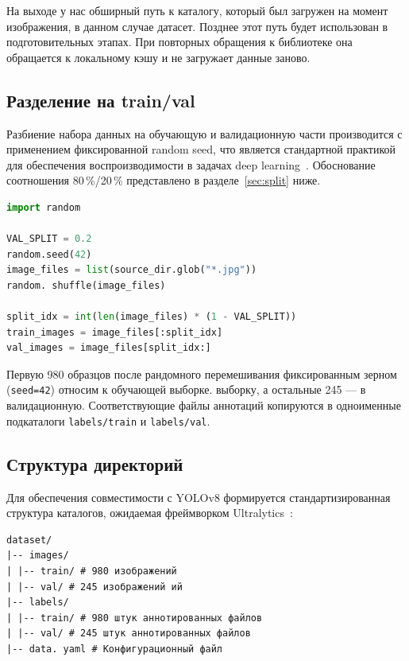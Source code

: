 На выходе у нас обширный путь к каталогу, который был загружен на момент изображения, в данном случае датасет. Позднее этот путь будет использован в подготовительных этапах. При повторных обращения к библиотеке она обращается к локальному кэшу и не загружает данные заново.

\subsection{Разделение на train/val}

Разбиение набора данных на обучающую и валидационную части производится с применением фиксированной random seed, что является стандартной практикой для обеспечения воспроизводимости в задачах deep learning~\cite{he2016resnet}. Обоснование соотношения 80\,\%/20\,\% представлено в разделе~\ref{sec:split} ниже.

\begin{lstlisting}[language=Python, caption=Разделение данных на обучающую и валидационную выборки, label=lst:split]
import random

VAL_SPLIT = 0.2
random.seed(42)
image_files = list(source_dir.glob("*.jpg"))
random. shuffle(image_files)

split_idx = int(len(image_files) * (1 - VAL_SPLIT))
train_images = image_files[:split_idx]
val_images = image_files[split_idx:]
\end{lstlisting}

Первую 980 образцов после рандомного перемешивания фиксированным зерном (\texttt{seed=42}) относим к обучающей выборке. выборку, а остальные 245 --- в валидационную. Соответствующие файлы аннотаций копируются в одноименные подкаталоги \texttt{labels/train} и \texttt{labels/val}.

\subsection{Структура директорий}

Для обеспечения совместимости с YOLOv8 формируется стандартизированная структура каталогов, ожидаемая фреймворком Ultralytics~\cite{ultralytics2023yolov8}:

\begin{verbatim}
dataset/
|-- images/
| |-- train/ # 980 изображений
| |-- val/ # 245 изображений ий
|-- labels/
| |-- train/ # 980 штук аннотированных файлов
| |-- val/ # 245 штук аннотированных файлов
|-- data. yaml # Конфигурационный файл
\end{verbatim}


